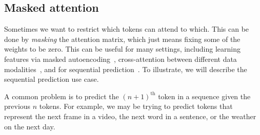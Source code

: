 \subsection{Masked attention}
Sometimes we want to restrict which tokens can attend to which. This can be done by \textit{masking} the attention matrix, which just means fixing some of the weights to be zero. This can be useful for many settings, including learning features via masked autoencoding~\cite{he2022masked}, cross-attention between different data modalities~\cite{wei2020multi}, and for sequential prediction~\cite{chen2020generative}. To illustrate, we will describe the sequential prediction use case.

A common problem is to predict the $(n+1)^{\text{th}}$ token in a sequence given the previous $n$ tokens. For example, we may be trying to predict tokens that represent the next frame in a video, the next word in a sentence, or the weather on the next day.

